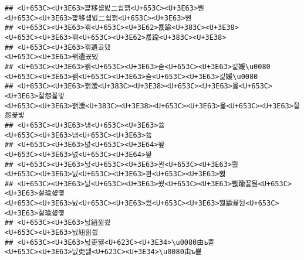 \documentclass[]{article}
\begin{document}
\begin{verbatim}
## <U+653C><U+3E63>꽕移섑빐二쇱꽭<U+653C><U+3E63>뿬                                                                                                                                                     <U+653C><U+3E63>꽕移섑빐二쇱꽭<U+653C><U+3E63>뿬
## <U+653C><U+3E63>꽦<U+653C><U+3E62>룞踰<U+383C><U+3E38>                                                                                                                                                     <U+653C><U+3E63>꽦<U+653C><U+3E62>룞踰<U+383C><U+3E38>
## <U+653C><U+3E63>꽦遺곴뎄                                                                                                                                                                                         <U+653C><U+3E63>꽦遺곴뎄
## <U+653C><U+3E63>꽭<U+653C><U+3E63>슫<U+653C><U+3E63>긽媛\u0080                                                                                                                                     <U+653C><U+3E63>꽭<U+653C><U+3E63>슫<U+653C><U+3E63>긽媛\u0080
## <U+653C><U+3E63>꽭湲<U+383C><U+3E38><U+653C><U+3E63>옱<U+653C><U+3E63>젙怨꾩빟                                                                                                                 <U+653C><U+3E63>꽭湲<U+383C><U+3E38><U+653C><U+3E63>옱<U+653C><U+3E63>젙怨꾩빟
## <U+653C><U+3E63>냼<U+653C><U+3E63>쓬                                                                                                                                                                             <U+653C><U+3E63>냼<U+653C><U+3E63>쓬
## <U+653C><U+3E63>넚<U+653C><U+3E64>뙆                                                                                                                                                                             <U+653C><U+3E63>넚<U+653C><U+3E64>뙆
## <U+653C><U+3E63>닔<U+653C><U+3E63>꽌<U+653C><U+3E63>뿭                                                                                                                                                     <U+653C><U+3E63>닔<U+653C><U+3E63>꽌<U+653C><U+3E63>뿭
## <U+653C><U+3E63>닔<U+653C><U+3E63>쑀<U+653C><U+3E63>뿭踰꾩뒪<U+653C><U+3E63>젙瑜섏옣                                                                                                     <U+653C><U+3E63>닔<U+653C><U+3E63>쑀<U+653C><U+3E63>뿭踰꾩뒪<U+653C><U+3E63>젙瑜섏옣
## <U+653C><U+3E63>닔紐낆씠                                                                                                                                                                                         <U+653C><U+3E63>닔紐낆씠
## <U+653C><U+3E63>닔吏덇<U+623C><U+3E34>\u0080由ъ뿉                                                                                                                                                 <U+653C><U+3E63>닔吏덇<U+623C><U+3E34>\u0080由ъ뿉

\end{verbatim}
\end{document}
